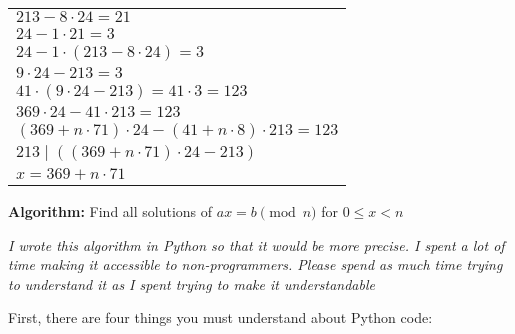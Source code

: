 \item
\begin{tabular}[t]{l}
\(213 - 8 \cdot 24 = 21\) \\
\(24 - 1 \cdot 21 = 3\) \\
\(24 - 1 \cdot (213 - 8 \cdot 24) = 3\) \\
\(9 \cdot 24 - 213 = 3\) \\
\(41 \cdot (9 \cdot 24 - 213) = 41 \cdot 3 = 123\) \\
\(369 \cdot 24 - 41 \cdot 213 = 123\) \\
\((369 + n \cdot 71) \cdot 24 - (41 + n \cdot 8) \cdot 213 = 123\) \\
\(213 \mid ((369 + n \cdot 71) \cdot 24 - 213)\) \\
\(x = 369 + n \cdot 71\)
\end{tabular}

\item \textbf{Algorithm:} Find all solutions of \(ax = b \pmod n\) for \(0 \leq x < n\)


\textit{\large I wrote this algorithm in Python so that it would be more precise. I spent a lot of time making it accessible to non-programmers. Please spend as much time trying to understand it as I spent trying to make it understandable}

First, there are four things you must understand about Python code:

